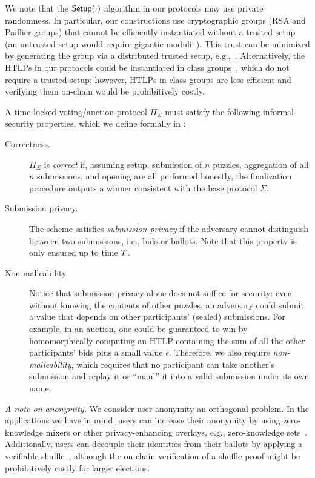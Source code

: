 We note that the $\mathsf{Setup}(\cdot)$ algorithm in our protocols may use private randomness. In particular, our constructions use cryptographic groups (RSA and Paillier groups) that cannot be efficiently instantiated without a trusted setup (an untrusted setup would require gigantic moduli~\cite{ICICS:Sander99}). This trust can be minimized by generating the group via a distributed trusted setup, e.g.,~\cite{JACM:BonFra01,SP:CHIKMRsVW21,TCC:DamMik10}.
Alternatively, the HTLPs in our protocols could be instantiated in class groups~\cite{CCS:TCLM21}, which do not require a trusted setup; however, HTLPs in class groups are less efficient and verifying them on-chain would be prohibitively costly.

A time-locked voting/auction protocol $\Pi_\Sigma$ must satisfy the following informal security properties, which we define formally in \cite{EPRINT:GSZB23}:
\begin{description}
    \item[Correctness.] $\Pi_\Sigma$ is \emph{correct} if, assuming setup, submission of $n$ puzzles, aggregation of all $n$ submissions, and opening are all performed honestly, the finalization procedure outputs a winner consistent with the base protocol $\Sigma$.
    \item[Submission privacy.] The scheme satisfies \emph{submission privacy} if the adversary cannot distinguish between two submissions, i.e., bids or ballots. Note that this property is only ensured up to time $T$.
    \item[Non-malleability.] Notice that submission privacy alone does not suffice for security: even without knowing the contents of other puzzles, an adversary could submit a value that depends on other participants' (sealed) submissions. For example, in an auction, one could be guaranteed to win by homomorphically computing an HTLP containing the sum of all the other participants' bids plus a small value $\epsilon$. Therefore, we also require \emph{non-malleability}, which requires that no participant can take another's submission and replay it or ``maul'' it into a valid submission under its own name.
\end{description}

\textit{A note on anonymity.} We consider user anonymity an orthogonal problem. In the applications we have in mind, users can increase their anonymity by using zero-knowledge mixers or other privacy-enhancing overlays, e.g., zero-knowledge sets~\cite{zksetsemaphore}. Additionally, users can decouple their identities from their ballots by applying a verifiable shuffle~\cite{CCS:Neff01}, although the on-chain verification of a shuffle proof might be prohibitively costly for larger elections. 


